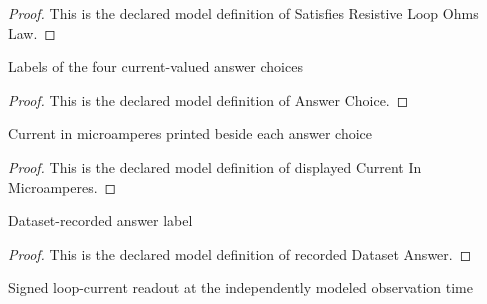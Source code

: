 \begin{proof}
  This is the declared model definition of Satisfies Resistive Loop Ohms Law.
\end{proof}
\begin{definition}
  \label{def:physics:phyx-mini-0930:phyxminiproblems-problemphyxmini0930-answerchoice}
  Labels of the four current-valued answer choices
\end{definition}
\begin{proof}
  This is the declared model definition of Answer Choice.
\end{proof}
\begin{definition}
  \label{def:physics:phyx-mini-0930:phyxminiproblems-problemphyxmini0930-answerchoice-displayedcurrentinmicroamperes}
  Current in microamperes printed beside each answer choice
\end{definition}
\begin{proof}
  This is the declared model definition of displayed Current In Microamperes.
\end{proof}
\begin{definition}
  \label{def:physics:phyx-mini-0930:phyxminiproblems-problemphyxmini0930-recordeddatasetanswer}
  Dataset-recorded answer label
\end{definition}
\begin{proof}
  This is the declared model definition of recorded Dataset Answer.
\end{proof}
\begin{definition}
  \label{def:physics:phyx-mini-0930:phyxminiproblems-problemphyxmini0930-observedloopcurrentinmicroamperes}
  Signed loop-current readout at the independently modeled observation time
\end{definition}
